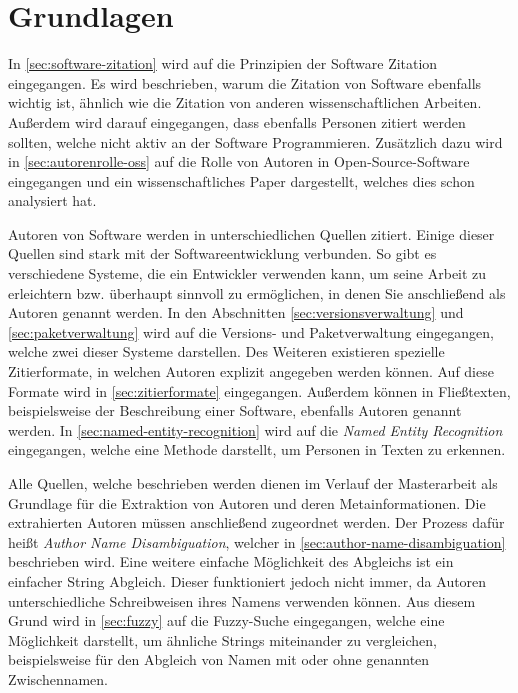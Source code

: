 \chapter{Grundlagen}
\label{chap:grundlagen}
In \autoref{sec:software-zitation} wird auf die Prinzipien der Software Zitation eingegangen.
Es wird beschrieben, warum die Zitation von Software ebenfalls wichtig ist, ähnlich wie die Zitation von anderen wissenschaftlichen Arbeiten.
Außerdem wird darauf eingegangen, dass ebenfalls Personen zitiert werden sollten, welche nicht aktiv an der Software Programmieren.
Zusätzlich dazu wird in \autoref{sec:autorenrolle-oss} auf die Rolle von Autoren in Open-Source-Software eingegangen und ein wissenschaftliches Paper dargestellt, welches dies schon analysiert hat.

Autoren von Software werden in unterschiedlichen Quellen zitiert.
Einige dieser Quellen sind stark mit der Softwareentwicklung verbunden.
So gibt es verschiedene Systeme, die ein Entwickler verwenden kann, um seine Arbeit zu erleichtern bzw. überhaupt sinnvoll zu ermöglichen, in denen Sie anschließend als Autoren genannt werden.
In den Abschnitten \ref{sec:versionsverwaltung} und \ref{sec:paketverwaltung} wird auf die Versions- und Paketverwaltung eingegangen, welche zwei dieser Systeme darstellen.
Des Weiteren existieren spezielle Zitierformate, in welchen Autoren explizit angegeben werden können.
Auf diese Formate wird in \autoref{sec:zitierformate} eingegangen.
Außerdem können in Fließtexten, beispielsweise der Beschreibung einer Software, ebenfalls Autoren genannt werden.
In \autoref{sec:named-entity-recognition} wird auf die \emph{Named Entity Recognition} eingegangen, welche eine Methode darstellt, um Personen in Texten zu erkennen.

Alle Quellen, welche beschrieben werden dienen im Verlauf der Masterarbeit als Grundlage für die Extraktion von Autoren und deren Metainformationen.
Die extrahierten Autoren müssen anschließend zugeordnet werden.
Der Prozess dafür heißt \emph{Author Name Disambiguation}, welcher in \autoref{sec:author-name-disambiguation} beschrieben wird.
Eine weitere einfache Möglichkeit des Abgleichs ist ein einfacher String Abgleich.
Dieser funktioniert jedoch nicht immer, da Autoren unterschiedliche Schreibweisen ihres Namens verwenden können.
Aus diesem Grund wird in \autoref{sec:fuzzy} auf die Fuzzy-Suche eingegangen, welche eine Möglichkeit darstellt, um ähnliche Strings miteinander zu vergleichen, beispielsweise für den Abgleich von Namen mit oder ohne genannten Zwischennamen.








